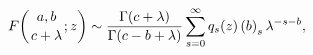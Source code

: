 \[\mathop{F\/}\nolimits\!\left({a,b\atop c+\lambda};z\right)\sim\frac{\mathop{%
\Gamma\/}\nolimits\!\left(c+\lambda\right)}{\mathop{\Gamma\/}\nolimits\!\left(%
c-b+\lambda\right)}\sum_{s=0}^{\infty}q_{s}(z)\left(b\right)_{s}\lambda^{-s-b},\]